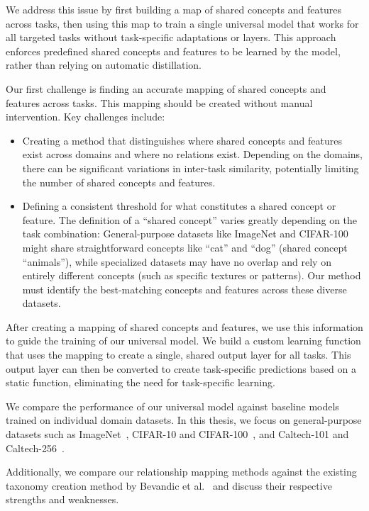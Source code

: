 We address this issue by first building a map of shared concepts and features across tasks,
then using this map to train a single universal model that works for all targeted tasks
without task-specific adaptations or layers.
This approach enforces predefined shared concepts and features to be learned by the model,
rather than relying on automatic distillation.

Our first challenge is finding an accurate mapping of shared concepts and features across tasks.
This mapping should be created without manual intervention.
Key challenges include:
\begin{itemize}
      \item Creating a method that distinguishes where shared concepts and features exist across domains
            and where no relations exist.
            Depending on the domains, there can be significant variations in inter-task similarity,
            potentially limiting the number of shared concepts and features.
      \item Defining a consistent threshold for what constitutes a shared concept or feature.
            The definition of a \enquote{shared concept} varies greatly depending on the task combination:
            General-purpose datasets like ImageNet and CIFAR-100 might share straightforward concepts like \enquote{cat} and \enquote{dog} (shared concept \enquote{animals}),
            while specialized datasets may have no overlap and rely on entirely different concepts
            (such as specific textures or patterns).
            Our method must identify the best-matching concepts and features across these diverse datasets.
\end{itemize}

After creating a mapping of shared concepts and features, we use this information to guide the training of our universal model.
We build a custom learning function that uses the mapping to create a single, shared output layer for all tasks.
This output layer can then be converted to create task-specific predictions based on a static function,
eliminating the need for task-specific learning.

We compare the performance of our universal model against baseline models trained on individual domain datasets.
In this thesis, we focus on general-purpose datasets such as ImageNet~\cite{deng_imagenet_2009,russakovsky_imagenet_2015},
CIFAR-10 and CIFAR-100~\cite{krizhevsky_learning_2009}, and Caltech-101 and Caltech-256~\cite{li_caltech_2022,griffin_caltech_2022}.

Additionally, we compare our relationship mapping methods against the existing taxonomy creation method
by Bevandic et al.~\cite{bevandic_automatic_2022,bevandic_weakly_2024} and discuss their respective strengths and weaknesses.
